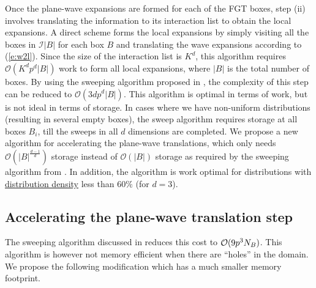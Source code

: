 
Once the plane-wave expansions are formed for each of the FGT boxes, step (ii)
involves translating the information to its interaction list to obtain the
local expansions. A direct scheme forms the local expansions by simply visiting
all the boxes in $\mathcal{I}|B|$ for each box $B$ and translating the wave
expansions according to (\ref{e:w2l}). Since the size of the interaction list
is $K^d$, this algorithm requires $\mathcal{O}(K^dp^d|B|)$ work to form all
local expansions, where $|B|$ is the total number of boxes. By using the
sweeping algorithm proposed in \cite{fggt}, the complexity of this step can be
reduced to $\mathcal{O}(3dp^d|B|)$. This algorithm is optimal in terms of work,
but is not ideal in terms of storage. In cases where we have non-uniform
distributions (resulting in several empty boxes), the sweep algorithm requires
storage at all boxes $B_i$, till the sweeps in all $d$ dimensions are
completed. We propose a new algorithm for accelerating the plane-wave
translations, which only needs $\mathcal{O}(|B|^\frac{d-1}{d})$ storage instead
of $\mathcal{O}(|B|)$ storage as required by the sweeping algorithm from
\cite{fggt}. In addition, the algorithm is work optimal for distributions with
\ul{distribution density} less than $60\%$ (for $d=3$).

\subsection{Accelerating the plane-wave translation step}
The sweeping algorithm discussed in \cite{fggt} reduces this cost to $\mathcal{O}(9 p^3 N_B)$. 
This algorithm is however not memory efficient when there are ``holes'' in the domain. We propose the following modification which has a much smaller memory footprint.


